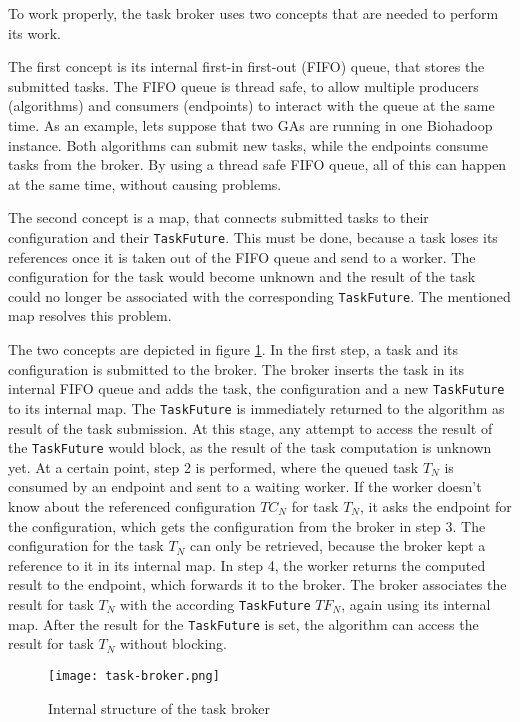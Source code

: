 To work properly, the task broker uses two concepts that are needed to perform its work. 

The first concept is its internal first-in first-out (FIFO) queue, that stores the submitted tasks. The FIFO queue is thread safe, to allow multiple producers (algorithms) and consumers (endpoints) to interact with the queue at the same time. As an example, lets suppose that two GAs are running in one Biohadoop instance. Both algorithms can submit new tasks, while the endpoints consume tasks from the broker. By using a thread safe FIFO queue, all of this can happen at the same time, without causing problems.

The second concept is a map, that connects submitted tasks to their configuration and their \texttt{TaskFuture}. This must be done, because a task loses its references once it is taken out of the FIFO queue and send to a worker. The configuration for the task would become unknown and the result of the task could no longer be associated with the corresponding \texttt{TaskFuture}. The mentioned map resolves this problem.

The two concepts are depicted in figure \ref{fig:task-broker}. In the first step, a task and its configuration is submitted to the broker. The broker inserts the task in its internal FIFO queue and adds the task, the configuration and a new \texttt{TaskFuture} to its internal map. The \texttt{TaskFuture} is immediately returned to the algorithm as result of the task submission. At this stage, any attempt to access the result of the \texttt{TaskFuture} would block, as the result of the task computation is unknown yet. At a certain point, step 2 is performed, where the queued task $T_N$ is consumed by an endpoint and sent to a waiting worker. If the worker doesn't know about the referenced configuration $TC_N$ for task $T_N$, it asks the endpoint for the configuration, which gets the configuration from the broker in step 3. The configuration for the task $T_N$ can only be retrieved, because the broker kept a reference to it in its internal map. In step 4, the worker returns the computed result to the endpoint, which forwards it to the broker. The broker associates the result for task $T_N$ with the according \texttt{TaskFuture} $TF_N$, again using its internal map. After the result for the \texttt{TaskFuture} is set, the algorithm can access the result for task $T_N$ without blocking.

\begin{figure}[ht!]
  \centering
  \texttt{[image: task-broker.png]}
  \caption{Internal structure of the task broker}
  \label{fig:task-broker}
\end{figure}

